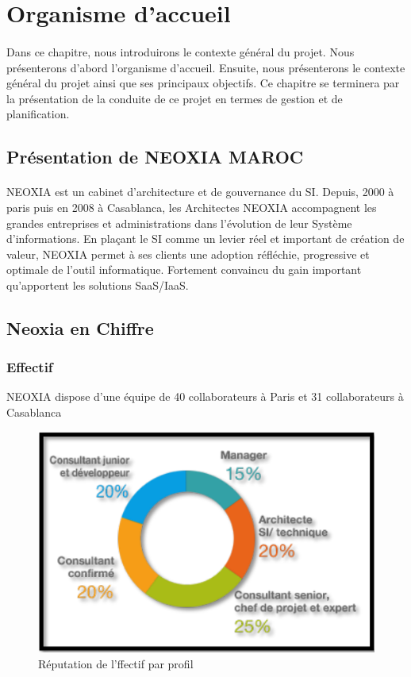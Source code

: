 \documentclass[a4paper, 12pt]{report}
\begin{document}
\section{Organisme d'accueil}

\paragraph{}
Dans ce chapitre, nous introduirons le contexte général du projet. Nous présenterons d'abord l'organisme d'accueil. Ensuite, nous présenterons le contexte général du projet ainsi que ses principaux objectifs. Ce chapitre se terminera par la présentation de la conduite de ce projet en termes de gestion et de planification.

\subsection{Présentation de NEOXIA MAROC}

\paragraph{}
NEOXIA est un cabinet d'architecture et de gouvernance du SI. Depuis, 2000 à paris puis en 2008 à Casablanca, les Architectes NEOXIA accompagnent les grandes entreprises et administrations dans l'évolution de leur Système d'informations. En plaçant le SI comme un levier réel et important de création de valeur, NEOXIA permet à ses clients une adoption réfléchie, progressive et optimale de l'outil informatique. Fortement convaincu du gain important qu’apportent les solutions SaaS/IaaS.

\subsection{Neoxia en Chiffre}
\subsubsection{Effectif}
NEOXIA dispose d’une équipe de 40 collaborateurs à Paris et 31 collaborateurs à
Casablanca

\begin{figure}[H]
\centering
\includegraphics[scale=0.9]{neoxiaprofil.png}
\caption{Réputation de l'ffectif par profil}
\end{figure}
\end{document}
